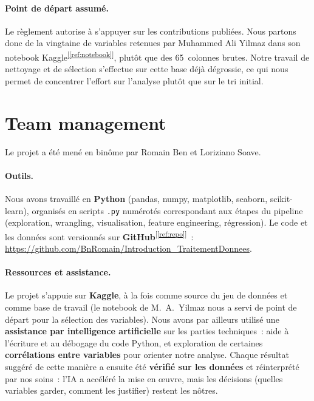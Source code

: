 \documentclass[11pt,a4paper]{article}
\newcommand{\refcite}[1]{\textsuperscript{\textcolor{refblue}{[\ref{#1}]}}}
\begin{document}
\paragraph{Point de départ assumé.} Le règlement autorise à s'appuyer sur les
contributions publiées. Nous partons donc de la vingtaine de variables
retenues par Muhammed Ali Yilmaz dans son notebook Kaggle\refcite{ref:notebook}, plutôt que des
65~colonnes brutes. Notre travail de nettoyage et de sélection s'effectue sur
cette base déjà dégrossie, ce qui nous permet de concentrer l'effort sur
l'analyse plutôt que sur le tri initial.

\section{Team management}

Le projet a été mené en binôme par Romain Ben et Loriziano Soave.

\paragraph{Outils.} Nous avons travaillé en \textbf{Python} (pandas, numpy,
matplotlib, seaborn, scikit-learn), organisés en scripts \texttt{.py}
numérotés correspondant aux étapes du pipeline (exploration, wrangling,
visualisation, feature engineering, régression). Le code et les données sont
versionnés sur \textbf{GitHub}\refcite{ref:repo}~: \url{https://github.com/BnRomain/Introduction_TraitementDonnees}.

\paragraph{Ressources et assistance.} Le projet s'appuie sur \textbf{Kaggle},
à la fois comme source du jeu de données et comme base de travail (le notebook
de M.~A.~Yilmaz nous a servi de point de départ pour la sélection des
variables). Nous avons par ailleurs utilisé une \textbf{assistance par
intelligence artificielle} sur les parties techniques~: aide à l'écriture et
au débogage du code Python, et exploration de certaines \textbf{corrélations
entre variables} pour orienter notre analyse. Chaque résultat suggéré de cette
manière a ensuite été \textbf{vérifié sur les données} et réinterprété par nos
soins~: l'IA a accéléré la mise en œuvre, mais les décisions (quelles variables
garder, comment les justifier) restent les nôtres.
\end{document}
